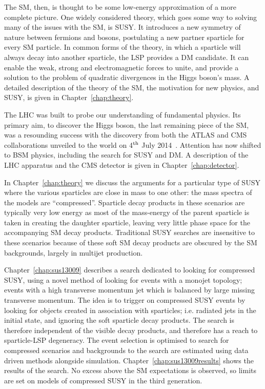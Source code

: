 The \ac{SM}, then, is thought to be some low-energy approximation of a more complete picture.
One widely considered theory, which goes some way to solving many of the issues with the \ac{SM}, is \ac{SUSY}.
It introduces a new symmetry of nature between fermions and bosons, postulating a new partner sparticle for every \ac{SM} particle. 
In common forms of the theory, in which a sparticle will always decay into another sparticle, the \ac{LSP} provides a \ac{DM} candidate. 
It can enable the weak, strong and electromagnetic forces to unite, and provide a solution to the problem of quadratic divergences in the Higgs boson's mass. 
A detailed description of the theory of the \ac{SM}, the motivation for new physics, and \ac{SUSY}, is given in Chapter~\ref{chap:theory}.

The LHC was built to probe our understanding of fundamental physics. 
Its primary aim, to discover the Higgs boson, the last remaining piece of the \ac{SM}, was a resounding success with the discovery from both the \ac{ATLAS} and \ac{CMS} collaborations unveiled to the world on 4$^{\rm th}$ July 2014~\cite{Aad:2012tfa,Chatrchyan:2012ufa}. 
Attention has now shifted to \ac{BSM} physics, including the search for \ac{SUSY} and \ac{DM}. 
A description of the LHC apparatus and the \ac{CMS} detector is given in Chapter~\ref{chap:detector}.

In Chapter~\ref{chap:theory} we discuss the arguments for a particular type of \ac{SUSY} where the various sparticles are close in mass to one other: the mass spectra of the models are ``compressed''. 
Sparticle decay products in these scenarios are typically very low energy as most of the mass-energy of the parent sparticle is taken in creating the daughter sparticle, leaving very little phase space for the accompanying \ac{SM} decay products.
Traditional \ac{SUSY} searches are insensitive to these scenarios because of these soft \ac{SM} decay products are obscured by the \ac{SM} backgrounds, largely in multijet production. 

Chapter~\ref{chap:sus13009} describes a search dedicated to looking for compressed \ac{SUSY}, using a novel method of looking for events with a monojet topology; events with a high transverse momentum jet which is balanced by large missing transverse momentum. 
The idea is to trigger on compressed \ac{SUSY} events by looking for objects created in association with sparticles; i.e. radiated jets in the initial state, and ignoring the soft sparticle decay products.
The search is therefore independent of the visible decay products, and therefore has a reach to sparticle-\ac{LSP} degeneracy.
The event selection is optimised to search for compressed scenarios and backgrounds to the search are estimated using data driven methods alongside simulation.
Chapter~\ref{chap:sus13009results} shows the results of the search. No excess above the \ac{SM} expectations is observed, so limits are set on models of compressed \ac{SUSY} in the third generation.


